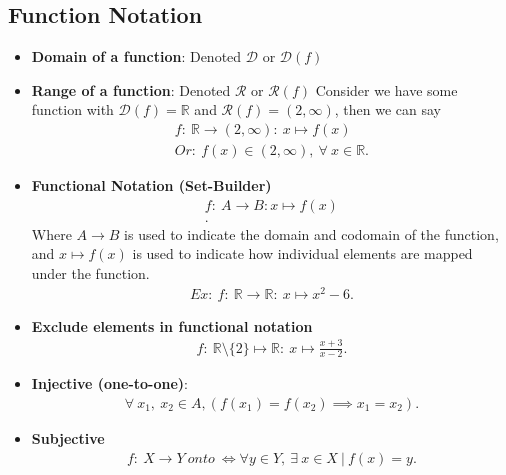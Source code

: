 \documentclass{report}
\begin{document}
      \bigbreak \noindent \bigbreak \noindent 
      \subsection{Function Notation}
      \bigbreak \noindent 
      \begin{itemize}
        \item  \textbf{Domain of a function}: Denoted $\mathcal{D}$ or $\mathcal{D}(f)$
        \item \textbf{Range of a function}: Denoted $\mathcal{R}$ or $\mathcal{R}(f)$
          Consider we have some function with $\mathcal{D}(f) = \mathbb{R}$ and $\mathcal{R}(f) = (2,\infty)$, then we can say 
          \begin{align*}
            f:\ \mathbb{R} \rightarrow (2,\infty):\ x \mapsto f(x) \\
            Or:\ f(x) \in (2,\infty),\ \forall\ x \in \mathbb{R}
          .\end{align*}
        \item \textbf{Functional Notation (Set-Builder)}
          \begin{align*}
            f:\ A \rightarrow B: x \mapsto f(x) \\
          .\end{align*}
            Where $A \rightarrow B $ is used to indicate the domain and codomain of the function, and  $x\mapsto f(x)$ is used to indicate how individual elements are mapped under the function. 
          \begin{align*}
              Ex:\ f:\ \mathbb{R} \rightarrow \mathbb{R}:\ x \mapsto x^{2}-6
          .\end{align*}
        \item \textbf{Exclude elements in functional notation}
          \begin{align*}
            f:\ \mathbb{R} \setminus \{2\} \mapsto \mathbb{R}:\ x \mapsto \frac{x+3}{x-2}
          .\end{align*}
        \item \textbf{Injective (one-to-one)}: 
          \begin{align*}
            \forall\ x_{1},\ x_{2} \in A, (f(x_{1}) = f(x_{2}) \implies x_{1} = x_{2})
          .\end{align*}
        \item \textbf{Subjective}
          \begin{align*}
            f:\ X \rightarrow Y\ onto\ \iff \forall y \in Y,\ \exists\ x \in X\ |\ f(x) = y
          .\end{align*}
      \end{itemize}
\end{document}
